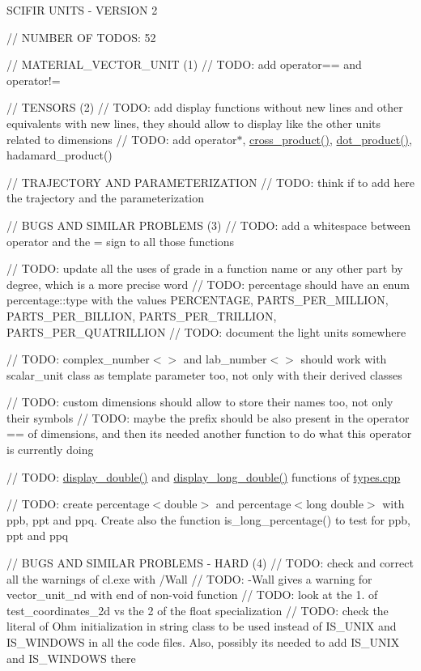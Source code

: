 SCIFIR UNITS -\/ VERSION 2

// NUMBER OF TODOS\+: 52

// MATERIAL\+\_\+\+VECTOR\+\_\+\+UNIT (1) // TODO\+: add operator== and operator!=

// TENSORS (2) // TODO\+: add display functions without new lines and other equivalents with new lines, they should allow to display like the other units related to dimensions // TODO\+: add operator$\ast$, \mbox{\hyperlink{namespacescifir_ac62851b9d931d02184edca7f3db3f1a7}{cross\+\_\+product()}}, \mbox{\hyperlink{namespacescifir_a732fc05956fd18f78cd0019c5c023b5c}{dot\+\_\+product()}}, hadamard\+\_\+product()

// TRAJECTORY AND PARAMETERIZATION // TODO\+: think if to add here the trajectory and the parameterization

// BUGS AND SIMILAR PROBLEMS (3) // TODO\+: add a whitespace between operator and the = sign to all those functions

// TODO\+: update all the uses of grade in a function name or any other part by degree, which is a more precise word // TODO\+: percentage should have an enum percentage\+::type with the values PERCENTAGE, PARTS\+\_\+\+PER\+\_\+\+MILLION, PARTS\+\_\+\+PER\+\_\+\+BILLION, PARTS\+\_\+\+PER\+\_\+\+TRILLION, PARTS\+\_\+\+PER\+\_\+\+QUATRILLION // TODO\+: document the light units somewhere

// TODO\+: complex\+\_\+number$<$$>$ and lab\+\_\+number$<$$>$ should work with scalar\+\_\+unit class as template parameter too, not only with their derived classes

// TODO\+: custom dimensions should allow to store their names too, not only their symbols // TODO\+: maybe the prefix should be also present in the operator == of dimensions, and then it\textquotesingle{}s needed another function to do what this operator is currently doing

// TODO\+: \mbox{\hyperlink{namespacescifir_a76943d4b7ab2e9ba278182abafa5378a}{display\+\_\+double()}} and \mbox{\hyperlink{namespacescifir_ab22ad226e1213d2c21d0f62848c03b39}{display\+\_\+long\+\_\+double()}} functions of \mbox{\hyperlink{types_8cpp}{types.\+cpp}}

// TODO\+: create percentage$<$double$>$ and percentage$<$long double$>$ with ppb, ppt and ppq. Create also the function is\+\_\+long\+\_\+percentage() to test for ppb, ppt and ppq

// BUGS AND SIMILAR PROBLEMS -\/ HARD (4) // TODO\+: check and correct all the warnings of cl.\+exe with /\+Wall // TODO\+: -\/Wall gives a warning for vector\+\_\+unit\+\_\+nd with end of non-\/void function // TODO\+: look at the 1. of test\+\_\+coordinates\+\_\+2d vs the 2 of the float specialization // TODO\+: check the literal of Ohm initialization in string class to be used instead of IS\+\_\+\+UNIX and IS\+\_\+\+WINDOWS in all the code files. Also, possibly it\textquotesingle{}s needed to add IS\+\_\+\+UNIX and IS\+\_\+\+WINDOWS there

